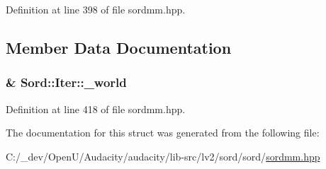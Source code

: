 Definition at line 398 of file sordmm.\+hpp.



\subsection{Member Data Documentation}
\subsubsection[{\texorpdfstring{\+\_\+world}{_world}}]{\& Sord\+::\+Iter\+::\+\_\+world}\hypertarget{struct_sord_1_1_iter_a2e08cbedee6dcee199cb314e74db1ecb}{}\label{struct_sord_1_1_iter_a2e08cbedee6dcee199cb314e74db1ecb}


Definition at line 418 of file sordmm.\+hpp.



The documentation for this struct was generated from the following file\+:\begin{DoxyCompactItemize}
\item 
C\+:/\+\_\+dev/\+Open\+U/\+Audacity/audacity/lib-\/src/lv2/sord/sord/\hyperlink{sordmm_8hpp}{sordmm.\+hpp}\end{DoxyCompactItemize}
